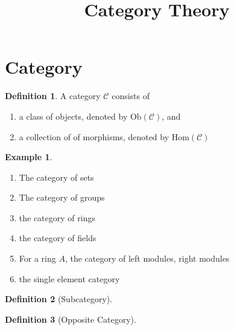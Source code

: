 \documentclass[a4paper]{scrartcl}
\title{Category Theory}
\theoremstyle{definition}
\newtheorem{definition}{Definition}[]
\newtheorem{example}{Example}[definition]
\begin{document}
\maketitle

\section{Category}
\begin{defbox}
  \begin{definition}
    A category \(\mathcal{C}\) consists of
    \begin{enumerate}
      \item a class of objects, denoted by \(\mathrm{Ob}(\mathcal{C})\), and
      \item a collection of of morphisms, denoted by \(\mathrm{Hom}(\mathcal{C})\)
    \end{enumerate}
  \end{definition}
\end{defbox}

\begin{exmbox}
  \begin{example}
    \begin{enumerate}
      \item The category of sets
      \item The category of groups
      \item the category of rings
      \item the category of fields
      \item For a ring \(A\), the category of left modules, right modules
      \item the single element category
    \end{enumerate}
  \end{example}
\end{exmbox}

\begin{defbox}
  \begin{definition}[Subcategory]
    
  \end{definition}
\end{defbox}

\begin{defbox}
  \begin{definition}[Opposite Category]
    
  \end{definition}
\end{defbox}
\end{document}
